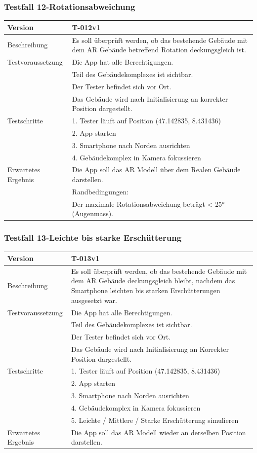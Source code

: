 \documentclass[a4paper]{scrreprt}
\begin{document}
\subsubsection{Testfall 12-Rotationsabweichung}
\begin{tabularx}{\textwidth}{|l|X|}
\hline 
	Version &
	T-012v1 \\ 
\hline 
	Beschreibung & 
	Es soll überprüft werden, ob das bestehende Gebäude mit dem AR Gebäude betreffend Rotation deckungsgleich ist. \\ 
\hline 
	Testvoraussetzung &
	Die App hat alle Berechtigungen. \\ &
	Teil des Gebäudekomplexes ist sichtbar. \\ &
	Der Tester befindet sich vor Ort. \\ &
	Das Gebäude wird nach Initialisierung an korrekter Position dargestellt. \\
\hline 
	Testschritte & 
		1. Tester läuft auf Position (47.142835, 8.431436)\\ &
		2. App starten\\ &
		3. Smartphone nach Norden ausrichten\\ &
		4. Gebäudekomplex in Kamera fokussieren\\
\hline
	Erwartetes Ergebnis &
	Die App soll das AR Modell über dem Realen Gebäude darstellen. \\ &
	Randbedingungen: \\ &
		Der maximale Rotationsabweichung beträgt < \ang{25} (Augenmass). \\ 
\hline 
\end{tabularx}

\subsubsection{Testfall 13-Leichte bis starke Erschütterung}
\begin{tabularx}{\textwidth}{|l|X|}
\hline 
	Version &
	T-013v1 \\ 
\hline 
	Beschreibung & 
	Es soll überprüft werden, ob das bestehende Gebäude mit dem AR Gebäude deckungsgleich bleibt, nachdem das Smartphone leichten bis starken Erschütterungen ausgesetzt war. \\ 
\hline 
	Testvoraussetzung &
	Die App hat alle Berechtigungen. \\ &
	Teil des Gebäudekomplexes ist sichtbar. \\ &
	Der Tester befindet sich vor Ort. \\ &
	Das Gebäude wird nach Initialisierung an Korrekter Position dargestellt. \\
\hline 
	Testschritte & 
		1. Tester läuft auf Position (47.142835, 8.431436) \\ &
		2. App starten\\ &
		3. Smartphone nach Norden ausrichten\\ &
		4. Gebäudekomplex in Kamera fokussieren\\ &
		5. Leichte / Mittlere / Starke Erschütterung simulieren\\
\hline
	Erwartetes Ergebnis &
	Die App soll das AR Modell wieder an derselben Position darstellen.\\ 
\hline 
\end{tabularx}
\end{document}
